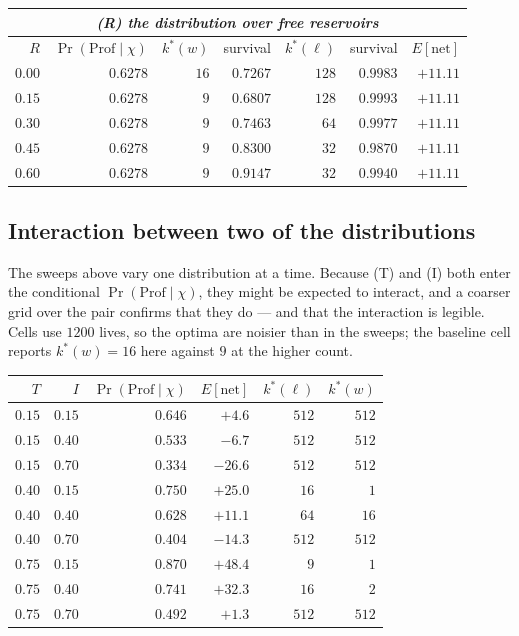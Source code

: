 \documentclass[11pt,a4paper]{article}
\theoremstyle{plain}
\theoremstyle{definition}
\theoremstyle{remark}
\begin{document}
\begin{center}
\begin{tabular}{rrrrrrr}
\multicolumn{7}{c}{\emph{(R) the distribution over free reservoirs}}\\[3pt]
\toprule
$R$ & $\Pr(\mathrm{Prof}\mid\chi)$ & $k^*(w)$ & survival & $k^*(\ell)$ & survival
& $E[\text{net}]$ \\
\midrule
$0.00$ & $0.6278$ & $16$ & $0.7267$ & $128$ & $0.9983$ & $+11.11$ \\
$0.15$ & $0.6278$ & $9$ & $0.6807$ & $128$ & $0.9993$ & $+11.11$ \\
$0.30$ & $0.6278$ & $9$ & $0.7463$ & $64$ & $0.9977$ & $+11.11$ \\
$0.45$ & $0.6278$ & $9$ & $0.8300$ & $32$ & $0.9870$ & $+11.11$ \\
$0.60$ & $0.6278$ & $9$ & $0.9147$ & $32$ & $0.9940$ & $+11.11$ \\
\bottomrule
\end{tabular}
\end{center}

\subsection{Interaction between two of the distributions}

The sweeps above vary one distribution at a time. Because (T) and (I) both enter
the conditional $\Pr(\mathrm{Prof}\mid\chi)$, they might be expected to interact,
and a coarser grid over the pair confirms that they do --- and that the
interaction is legible. Cells use $1200$ lives, so the optima are noisier than in
the sweeps; the baseline cell reports $k^*(w) = 16$ here against $9$ at the
higher count.

\begin{center}
\begin{tabular}{rrrrrr}
\toprule
$T$ & $I$ & $\Pr(\mathrm{Prof}\mid\chi)$ & $E[\text{net}]$ & $k^*(\ell)$ & $k^*(w)$ \\
\midrule
$0.15$ & $0.15$ & $0.646$ & $+4.6$ & $512$ & $512$ \\
$0.15$ & $0.40$ & $0.533$ & $-6.7$ & $512$ & $512$ \\
$0.15$ & $0.70$ & $0.334$ & $-26.6$ & $512$ & $512$ \\
$0.40$ & $0.15$ & $0.750$ & $+25.0$ & $16$ & $1$ \\
$0.40$ & $0.40$ & $0.628$ & $+11.1$ & $64$ & $16$ \\
$0.40$ & $0.70$ & $0.404$ & $-14.3$ & $512$ & $512$ \\
$0.75$ & $0.15$ & $0.870$ & $+48.4$ & $9$ & $1$ \\
$0.75$ & $0.40$ & $0.741$ & $+32.3$ & $16$ & $2$ \\
$0.75$ & $0.70$ & $0.492$ & $+1.3$ & $512$ & $512$ \\
\bottomrule
\end{tabular}
\end{center}
\end{document}

